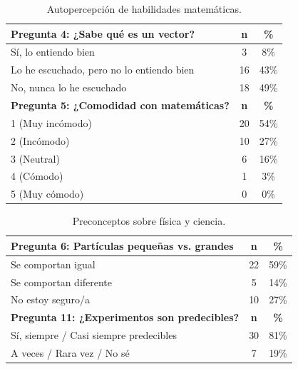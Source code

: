 \documentclass[10pt,a4paper]{article}
\begin{document}
\begin{table}[h!]
\centering
\caption{Autopercepción de habilidades matemáticas.}
\label{tab:pre_math}
\begin{tabular}{|l|c|c|}
\hline
\textbf{Pregunta 4: ¿Sabe qué es un vector?} & \textbf{n} & \textbf{\%} \\
\hline
Sí, lo entiendo bien & 3 & 8\% \\
Lo he escuchado, pero no lo entiendo bien & 16 & 43\% \\
No, nunca lo he escuchado & 18 & 49\% \\
\hline
\textbf{Pregunta 5: ¿Comodidad con matemáticas?} & \textbf{n} & \textbf{\%} \\
\hline
1 (Muy incómodo) & 20 & 54\% \\
2 (Incómodo) & 10 & 27\% \\
3 (Neutral) & 6 & 16\% \\
4 (Cómodo) & 1 & 3\% \\
5 (Muy cómodo) & 0 & 0\% \\
\hline
\end{tabular}
\end{table}

\begin{table}[h!]
\centering
\caption{Preconceptos sobre física y ciencia.}
\label{tab:pre_physics}
\begin{tabular}{|l|c|c|}
\hline
\textbf{Pregunta 6: Partículas pequeñas vs. grandes} & \textbf{n} & \textbf{\%} \\
\hline
Se comportan igual & 22 & 59\% \\
Se comportan diferente & 5 & 14\% \\
No estoy seguro/a & 10 & 27\% \\
\hline
\textbf{Pregunta 11: ¿Experimentos son predecibles?} & \textbf{n} & \textbf{\%} \\
\hline
Sí, siempre / Casi siempre predecibles & 30 & 81\% \\
A veces / Rara vez / No sé & 7 & 19\% \\
\hline
\end{tabular}
\end{table}
\end{document}
